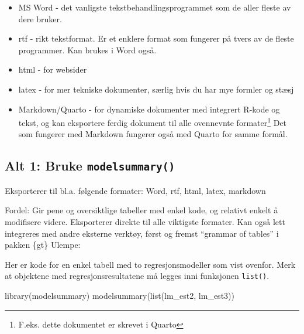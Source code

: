 \documentclass[
  norsk,
  letterpaper,
  DIV=11,
  numbers=noendperiod]{scrreprt}
\newenvironment{Shaded}{\begin{snugshade}}{\end{snugshade}}
\newcommand{\FunctionTok}[1]{\textcolor[rgb]{0.28,0.35,0.67}{#1}}
\newcommand{\NormalTok}[1]{\textcolor[rgb]{0.00,0.23,0.31}{#1}}
\providecommand{\tightlist}{%
  \setlength{\itemsep}{0pt}\setlength{\parskip}{0pt}}
\theoremstyle{definition}
\theoremstyle{remark}
\begin{document}
\begin{itemize}
\tightlist
\item
  MS Word - det vanligste tekstbehandlingsprogrammet som de aller fleste
  av dere bruker.
\item
  rtf - rikt tekstformat. Er et enklere format som fungerer på tvers av
  de fleste programmer. Kan brukes i Word også.
\item
  html - for websider
\item
  latex - for mer tekniske dokumenter, særlig hvis du har mye formler og
  stæsj
\item
  Markdown/Quarto - for dynamiske dokumenter med integrert R-kode og
  tekst, og kan eksportere ferdig dokument til alle ovennevnte
  formater\footnote{F.eks. dette dokumentet er skrevet i Quarto} Det som
  fungerer med Markdown fungerer også med Quarto for samme formål.
\end{itemize}

\subsection{\texorpdfstring{Alt 1: Bruke
\texttt{modelsummary()}}{Alt 1: Bruke modelsummary()}}\label{alt-1-bruke-modelsummary}

Eksporterer til bl.a. følgende formater: Word, rtf, html, latex,
markdown

Fordel: Gir pene og oversiktlige tabeller med enkel kode, og relativt
enkelt å modifisere videre. Eksporterer direkte til alle viktigste
formater. Kan også lett integreres med andre eksterne verktøy, først og
fremst ``grammar of tables'' i pakken \{gt\} Ulempe:

Her er kode for en enkel tabell med to regresjonsmodeller som vist
ovenfor. Merk at objektene med regresjonsresultatene må legges inni
funksjonen \texttt{list()}.

\begin{Shaded}
\begin{Highlighting}[]
\FunctionTok{library}\NormalTok{(modelsummary)}
\FunctionTok{modelsummary}\NormalTok{(}\FunctionTok{list}\NormalTok{(lm\_est2, lm\_est3))}
\end{Highlighting}
\end{Shaded}
\end{document}
